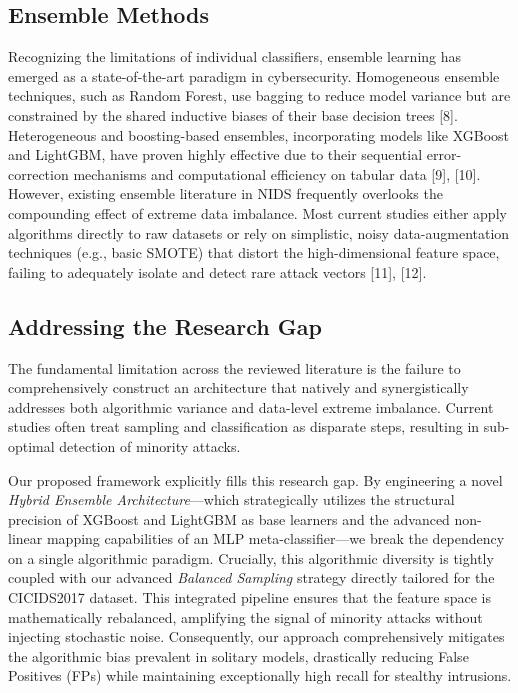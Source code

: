 \subsection{Ensemble Methods}
Recognizing the limitations of individual classifiers, ensemble learning has emerged as a state-of-the-art paradigm in cybersecurity. Homogeneous ensemble techniques, such as Random Forest, use bagging to reduce model variance but are constrained by the shared inductive biases of their base decision trees [8]. Heterogeneous and boosting-based ensembles, incorporating models like XGBoost and LightGBM, have proven highly effective due to their sequential error-correction mechanisms and computational efficiency on tabular data [9], [10]. However, existing ensemble literature in NIDS frequently overlooks the compounding effect of extreme data imbalance. Most current studies either apply algorithms directly to raw datasets or rely on simplistic, noisy data-augmentation techniques (e.g., basic SMOTE) that distort the high-dimensional feature space, failing to adequately isolate and detect rare attack vectors [11], [12].

\subsection{Addressing the Research Gap}
The fundamental limitation across the reviewed literature is the failure to comprehensively construct an architecture that natively and synergistically addresses both algorithmic variance and data-level extreme imbalance. Current studies often treat sampling and classification as disparate steps, resulting in sub-optimal detection of minority attacks.

Our proposed framework explicitly fills this research gap. By engineering a novel \textit{Hybrid Ensemble Architecture}—which strategically utilizes the structural precision of XGBoost and LightGBM as base learners and the advanced non-linear mapping capabilities of an MLP meta-classifier—we break the dependency on a single algorithmic paradigm. Crucially, this algorithmic diversity is tightly coupled with our advanced \textit{Balanced Sampling} strategy directly tailored for the CICIDS2017 dataset. This integrated pipeline ensures that the feature space is mathematically rebalanced, amplifying the signal of minority attacks without injecting stochastic noise. Consequently, our approach comprehensively mitigates the algorithmic bias prevalent in solitary models, drastically reducing False Positives (FPs) while maintaining exceptionally high recall for stealthy intrusions.
